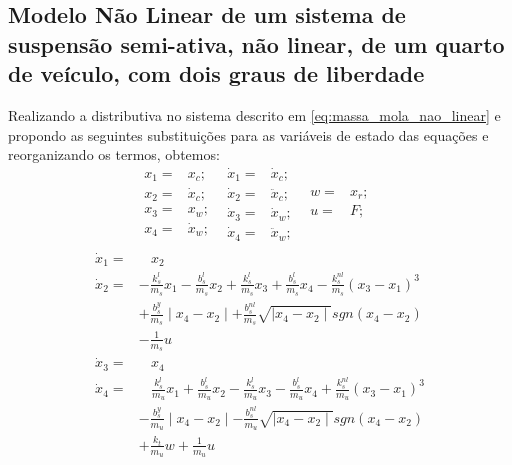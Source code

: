 \subsection{Modelo Não Linear de um sistema de suspensão semi-ativa, não linear, de um quarto de veículo, com dois graus de liberdade }
Realizando a distributiva no sistema descrito em \eqref{eq:massa_mola_nao_linear} e propondo as seguintes substituições para as variáveis de estado das equações e reorganizando os termos, obtemos: 
\begin{equation*}
  \begin{split}
    x_{1}=&x_{c};\ \ \\
    x_{2}=&\dot{x}_{c};\ \ \\ 
    x_{3}=&x_{w};\ \ \\        
    x_{4}=&\dot{x}_{w};\ \ \\
  \end{split}
  \begin{split}
    \dot{x}_{1}=&\dot{x}_{c};\ \ \\
    \dot{x}_{2}=&\ddot{x}_{c};\ \ \\
    \dot{x}_{3}=&\dot{x}_{w};\ \ \\    
    \dot{x}_{4}=&\ddot{x}_{w};\ \ \\
  \end{split}
  \begin{split}
    w=&x_{r};\ \ \\
    u=&F;\ \ \\
  \end{split} 
\end{equation*}
\begin{equation} \label{eq:massa_mola_nao_linear_SS}
  \begin{aligned}
    \dot{x}_{1}=&\ \ \ \ x_{2}\\    
    \dot{x}_{2}=&-\frac{k^l_s}{m_s}x_1-\frac{b^l_s}{m_s}x_2+\frac{k^l_s}{m_s}x_3+\frac{b^l_s}{m_s}x_4-\frac{k^{nl}_s}{m_s}(x_3-x_1)^3\\
          &+\frac{b^y_s}{m_s}\mid x_4-x_2\mid+\frac{b^{nl}_s}{m_s}\sqrt{\mid x_4-x_2\mid}sgn(x_4-x_2)\\
          &-\frac{1}{m_s}u\\  
    \dot{x}_{3}=&\ \ \ \ x_{4}\\
    \dot{x}_{4}=&\ \ \ \ \frac{k^l_s}{m_u}x_1+\frac{b^l_s}{m_u}x_2-\frac{k^l_s}{m_u}x_3-\frac{b^l_s}{m_u}x_4+\frac{k^{nl}_s}{m_u}(x_3-x_1)^3\\
          &-\frac{b^y_s}{m_u}\mid x_4-x_2\mid-\frac{b^{nl}_s}{m_u}\sqrt{\mid x_4-x_2\mid}sgn(x_4-x_2)\\
          &+\frac{k_t}{m_u}w+\frac{1}{m_u}u\\
  \end{aligned}
\end{equation}
  
